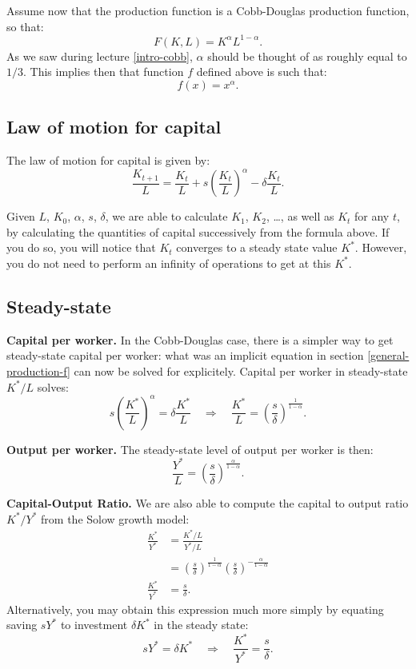 \documentclass[]{book}
\theoremstyle{definition}
\theoremstyle{definition}
\theoremstyle{definition}
\theoremstyle{remark}
\begin{document}
Assume now that the production function is a Cobb-Douglas production
function, so that:\\
\[F(K,L)=K^{\alpha}L^{1-\alpha}.\] As we saw during lecture
\ref{intro-cobb}, \(\alpha\) should be thought of as roughly equal to
\(1/3\). This implies then that function \(f\) defined above is such
that: \[f(x)=x^{\alpha}.\]

\subsection{Law of motion for capital}\label{law-of-motion-for-capital}

The law of motion for capital is given by:\\
\[\frac{K_{t+1}}{L}=\frac{K_{t}}{L}+s\left(\frac{K_{t}}{L}\right)^{\alpha}-\delta\frac{K_{t}}{L}.\]

Given \(L\), \(K_{0}\), \(\alpha\), \(s\), \(\delta\), we are able to
calculate \(K_{1}\), \(K_{2}\), \ldots{}, as well as \(K_{t}\) for any
\(t\), by calculating the quantities of capital successively from the
formula above. If you do so, you will notice that \(K_{t}\) converges to
a steady state value \(K^{*}\). However, you do not need to perform an
infinity of operations to get at this \(K^{*}\).

\subsection{Steady-state}\label{cobb-solow-steady-state}

\textbf{Capital per worker.} In the Cobb-Douglas case, there is a
simpler way to get steady-state capital per worker: what was an implicit
equation in section \ref{general-production-f} can now be solved for
explicitely. Capital per worker in steady-state \(K^{*}/L\) solves:
\[s\left(\frac{K^{*}}{L}\right)^{\alpha}=\delta\frac{K^{*}}{L}\quad\Rightarrow\quad \boxed{\frac{K^{*}}{L}=\left(\frac{s}{\delta}\right)^{\frac{1}{1-\alpha}}}.\]

\textbf{Output per worker.} The steady-state level of output per worker
is then:
\[\boxed{\frac{Y^{*}}{L}=\left(\frac{s}{\delta}\right)^{\frac{\alpha}{1-\alpha}}}.\]

\textbf{Capital-Output Ratio.} We are also able to compute the capital
to output ratio \(K^{*}/Y^{*}\) from the Solow growth model: \[
\begin{aligned}
\frac{K^{*}}{Y^{*}}&=\frac{K^{*}/L}{Y^{*}/L}\\
&=\left(\frac{s}{\delta}\right)^{\frac{1}{1-\alpha}}  \left(\frac{s}{\delta}\right)^{-\frac{\alpha}{1-\alpha}} \\
\frac{K^{*}}{Y^{*}}&= \frac{s}{\delta}.
\end{aligned}
\] Alternatively, you may obtain this expression much more simply by
equating saving \(sY^{*}\) to investment \(\delta K^{*}\) in the steady
state:
\[sY^{*} = \delta K^{*} \quad \Rightarrow \quad \boxed{\frac{K^{*}}{Y^{*}} = \frac{s}{\delta}}.\]
\end{document}
